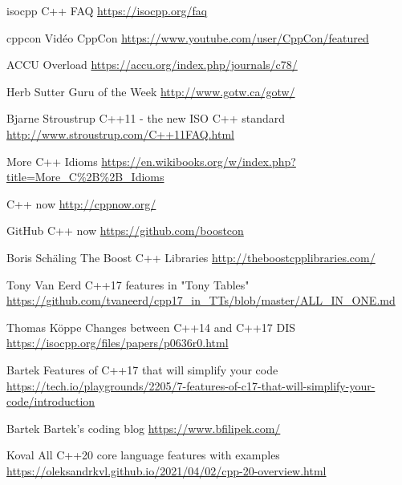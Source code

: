 \documentclass[C++.tex]{subfiles}
\begin{document}
\begin{frame}[allowframebreaks]
\begin{thebibliography}{1}
		isocpp
		\newblock C++ FAQ
		\newblock \url{https://isocpp.org/faq}

		cppcon
		\newblock Vidéo CppCon
		\newblock \url{https://www.youtube.com/user/CppCon/featured}

		ACCU
		\newblock Overload
		\newblock \url{https://accu.org/index.php/journals/c78/}

		Herb Sutter
		\newblock Guru of the Week
		\newblock \url{http://www.gotw.ca/gotw/}

		Bjarne Stroustrup
		\newblock C++11 - the new ISO C++ standard
		\newblock \url{http://www.stroustrup.com/C++11FAQ.html}
			
		\newblock More C++ Idioms
		\newblock \url{https://en.wikibooks.org/w/index.php?title=More\_C\%2B\%2B\_Idioms}

		\newblock C++ now
		\newblock \url{http://cppnow.org/}

		\newblock GitHub C++ now
		\newblock \url{https://github.com/boostcon}

		Boris Schäling
		\newblock The Boost C++ Libraries
		\newblock \url{http://theboostcpplibraries.com/}

		Tony Van Eerd
		\newblock C++17 features in "Tony Tables"
		\newblock \url{https://github.com/tvaneerd/cpp17_in_TTs/blob/master/ALL_IN_ONE.md}

		Thomas Köppe
		\newblock Changes between C++14 and C++17 DIS
		\newblock \url{https://isocpp.org/files/papers/p0636r0.html}

		Bartek
		 Features of C++17 that will simplify your code
		\newblock \url{https://tech.io/playgrounds/2205/7-features-of-c17-that-will-simplify-your-code/introduction}

		Bartek
		\newblock Bartek's coding blog
		\newblock \url{https://www.bfilipek.com/}

		Koval
		\newblock All C++20 core language features with examples
		\newblock \url{https://oleksandrkvl.github.io/2021/04/02/cpp-20-overview.html}
	\end{thebibliography}
\end{frame}
\end{document}

